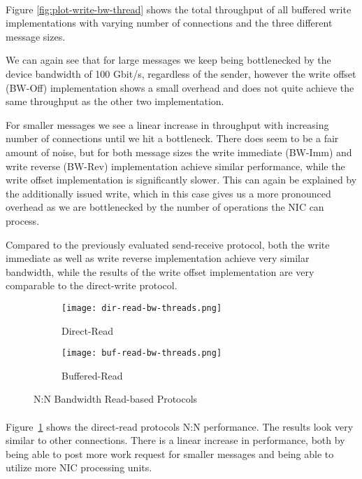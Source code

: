 \paragraph{} Figure \ref{fig:plot-write-bw-thread} shows the total throughput of all buffered write implementations
with varying number of connections and the three different message sizes.

We can again see that for large messages we keep being bottlenecked by the device bandwidth of 100 Gbit/s, regardless of 
the sender, however the write offset (BW-Off) implementation shows a small overhead and does not quite achieve the same 
throughput as the other two implementation. 

For smaller messages we see a linear increase in throughput with increasing number of connections until we hit a bottleneck. 
There does seem to be a fair amount of noise,
but for both message sizes the write immediate (BW-Imm) and write reverse (BW-Rev) implementation achieve similar performance,
while the write offset implementation is significantly slower. This can again be explained by the additionally issued write, 
which in this case  gives us a more pronounced overhead as we are bottlenecked by the number of operations the NIC can process.


Compared to the previously evaluated send-receive protocol, both the write immediate as well as write reverse implementation
achieve very 
similar bandwidth, while the results of the write offset implementation are very comparable to the direct-write protocol.


\begin{figure}[ht]
  \begin{subfigure}[b]{0.49\textwidth}
  \centering
  \texttt{[image: dir-read-bw-threads.png]}
  \caption{Direct-Read}
  \label{fig:plot-dirread-bw-threads}
  \end{subfigure}
  \begin{subfigure}[b]{0.49\textwidth}
  \centering
  \texttt{[image: buf-read-bw-threads.png]}
  \caption{Buffered-Read}
  \label{fig:plot-bufread-bw-threads}
  \end{subfigure}
  \caption{N:N Bandwidth Read-based Protocols}
\end{figure}

\paragraph{}Figure~\ref{fig:plot-dirread-bw-threads} shows the direct-read protocols N:N performance. The results look very similar to 
other connections. There is a linear increase in performance, both by being able to post more work request for smaller 
messages and being able to utilize more NIC processing units.~\cite{anuj-guide}

